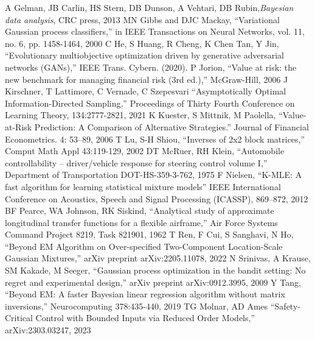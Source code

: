 \documentclass{amsart}
\begin{document}
\begin{thebibliography}{00}
 A Gelman, JB Carlin, HS Stern, DB Dunson, A Vehtari, DB Rubin,\textit{Bayesian data analysis}, CRC press, 2013
 MN Gibbs and DJC Mackay, ``Variational Gaussian process classifiers,'' in IEEE Transactions on Neural Networks, vol. 11, no. 6, pp. 1458-1464, 2000
 C He, S Huang, R Cheng, K Chen Tan, Y Jin, ``Evolutionary multiobjective optimization driven by generative adversarial networks (GANs),'' IEEE Trans. Cybern. (2020).
 P Jorion, ``Value at risk: the new benchmark for managing financial risk (3rd ed.),'' McGraw-Hill, 2006
 J Kirschner, T Lattimore, C Vernade, C Szepesvari ``Asymptotically Optimal Information-Directed Sampling,'' Proceedings of Thirty Fourth Conference on Learning Theory, 134:2777-2821, 2021
 K Kuester, S Mittnik, M Paolella, ``Value-at-Risk Prediction: A Comparison of Alternative Strategies.'' Journal of Financial Econometrics. 4: 53–89, 2006
 T Lu, S-H Shiou, ``Inverses of 2x2 block matrices,'' Comput Math Appl 43:119-129, 2002
 DT McRuer, RH Klein, ``Automobile controllability -- driver/vehicle response for steering control volume I,'' Department of Transportation DOT-HS-359-3-762, 1975
 F Nielsen, ``K-MLE: A fast algorithm for learning statistical mixture models'' IEEE International Conference on Acoustics, Speech and Signal Processing (ICASSP), 869–872, 2012
 BF Pearce, WA Johnson, RK Siskind, ``Analytical study of approximate longitudinal transfer functions for a flexible airframe,'' Air Force Systems Command Project 8219, Task 821901, 1962
 T Ren, F Cui, S Sanghavi, N Ho, ``Beyond EM Algorithm on Over-specified Two-Component Location-Scale Gaussian Mixtures,'' arXiv preprint arXiv:2205.11078, 2022
 N Srinivas, A Krause, SM Kakade, M Seeger, ``Gaussian process optimization in the bandit setting: No regret and experimental design,'' arXiv preprint arXiv:0912.3995, 2009
 Y Tang, ``Beyond EM: A faster Bayesian linear regression algorithm without matrix inversions,'' Neurocomputing 378:435-440, 2019
 TG Molnar, AD Ames ``Safety-Critical Control with Bounded Inputs via Reduced Order Models,'' arXiv:2303.03247, 2023
\end{thebibliography}
\end{document}
